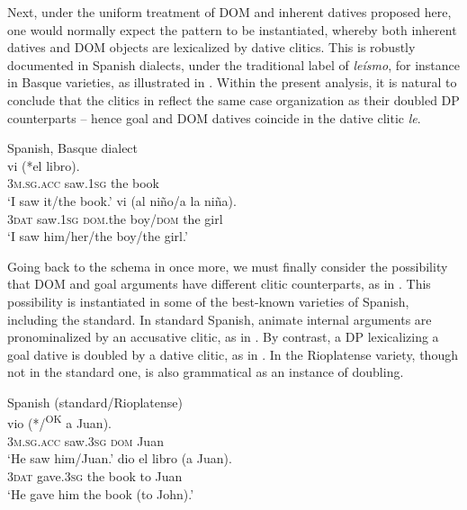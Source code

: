 \documentclass[output=paper,colorlinks,citecolor=brown,modfonts,nonflat]{langsci/langscibook}
\begin{document}
Next, under the uniform treatment of DOM and inherent datives proposed here, one would normally expect the pattern  to be instantiated, whereby both inherent datives and DOM objects are lexicalized by dative clitics. This is robustly documented in Spanish dialects, under the traditional label of \textit{leísmo}, for instance in Basque varieties, as illustrated in . Within the present analysis, it is natural to conclude that the clitics in  reflect the same case organization as their doubled DP counterparts – hence goal and DOM datives coincide in the dative clitic \textit{le}.

\ea%
    \label{ex:manzini:23}
    Spanish, Basque dialect \citep{OrmazabalRomero2013Probus}\\
    \ea\label{ex:manzini:23a}      {vi}     (*el libro).\\
        \textsc{3m.sg.acc}  saw.\textsc{1sg}  {\db}the book\\
    \glt ‘I saw it/the book.’
    \ex\label{ex:manzini:23b}    {vi}     (al niño/a la niña).\\
        \textsc{3dat}  saw.\textsc{1sg}  \textsc{dom}.the boy/\textsc{dom} the girl\\
    \glt ‘I saw him/her/the boy/the girl.’
    \z
\z

Going back to the schema in  once more, we must finally consider the possibility that DOM and goal arguments have different clitic counterparts, as in . This possibility is instantiated in some of the best-known varieties of Spanish, including the standard. In standard Spanish, animate internal arguments are pronominalized by an accusative clitic, as in . By contrast, a DP lexicalizing a goal dative is doubled by a dative clitic, as in . In the Rioplatense variety, though not in the standard one,  is also grammatical as an instance of doubling.

\newpage
\ea%
    \label{ex:manzini:24}
    Spanish (standard/Rioplatense)\\
    \ea\label{ex:manzini:24a}
         {vio}    (*/\textsuperscript{OK} {a} Juan).\\
        \textsc{3m.sg.acc}  {}                     saw.\textsc{3sg}  \textsc{dom} Juan\\
    \glt ‘He saw him/Juan.’
    \ex\label{ex:manzini:24b}
       {dio}     {el} {libro}   (a Juan).\\
        \textsc{3dat}   gave.\textsc{3sg}  the book   to Juan\\
    \glt ‘He gave him the book (to John).’
    \z
\z
\end{document}
